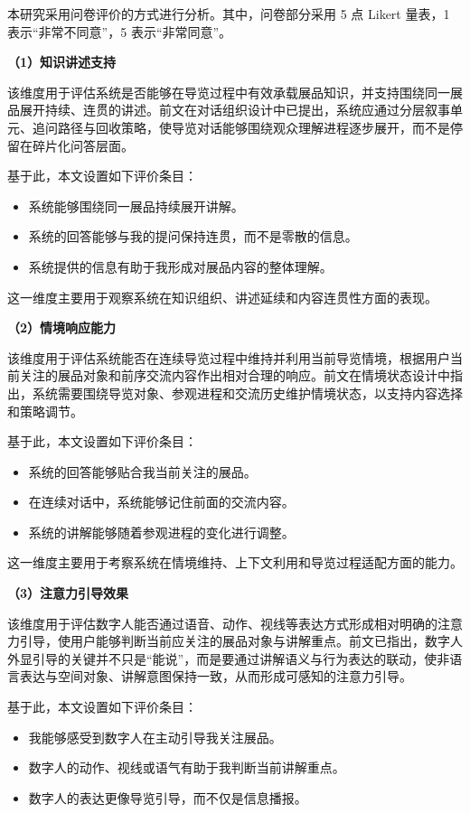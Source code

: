 本研究采用问卷评价的方式进行分析。其中，问卷部分采用 5 点 Likert 量表，1 表示“非常不同意”，5 表示“非常同意”。

\textbf{（1）知识讲述支持}

该维度用于评估系统是否能够在导览过程中有效承载展品知识，并支持围绕同一展品展开持续、连贯的讲述。前文在对话组织设计中已提出，系统应通过分层叙事单元、追问路径与回收策略，使导览对话能够围绕观众理解进程逐步展开，而不是停留在碎片化问答层面。

基于此，本文设置如下评价条目：
\begin{itemize}
    \item 系统能够围绕同一展品持续展开讲解。
    \item 系统的回答能够与我的提问保持连贯，而不是零散的信息。
    \item 系统提供的信息有助于我形成对展品内容的整体理解。
\end{itemize}

这一维度主要用于观察系统在知识组织、讲述延续和内容连贯性方面的表现。

\textbf{（2）情境响应能力}

该维度用于评估系统能否在连续导览过程中维持并利用当前导览情境，根据用户当前关注的展品对象和前序交流内容作出相对合理的响应。前文在情境状态设计中指出，系统需要围绕导览对象、参观进程和交流历史维护情境状态，以支持内容选择和策略调节。

基于此，本文设置如下评价条目：
\begin{itemize}
    \item 系统的回答能够贴合我当前关注的展品。
    \item 在连续对话中，系统能够记住前面的交流内容。
    \item 系统的讲解能够随着参观进程的变化进行调整。
\end{itemize}

这一维度主要用于考察系统在情境维持、上下文利用和导览过程适配方面的能力。

\textbf{（3）注意力引导效果}

该维度用于评估数字人能否通过语音、动作、视线等表达方式形成相对明确的注意力引导，使用户能够判断当前应关注的展品对象与讲解重点。前文已指出，数字人外显引导的关键并不只是“能说”，而是要通过讲解语义与行为表达的联动，使非语言表达与空间对象、讲解意图保持一致，从而形成可感知的注意力引导。

基于此，本文设置如下评价条目：
\begin{itemize}
    \item 我能够感受到数字人在主动引导我关注展品。
    \item 数字人的动作、视线或语气有助于我判断当前讲解重点。
    \item 数字人的表达更像导览引导，而不仅是信息播报。
\end{itemize}

